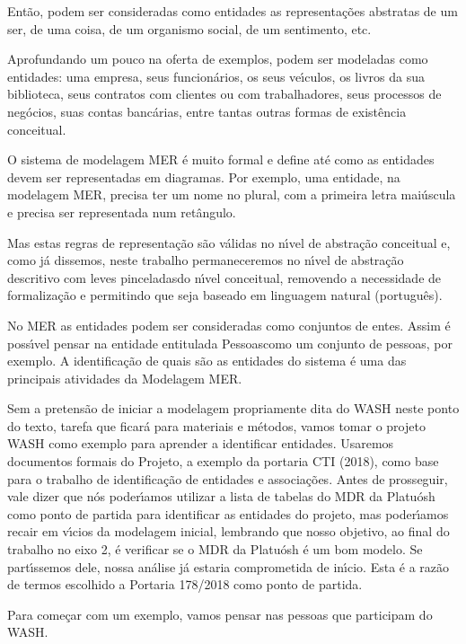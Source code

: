 \documentclass[
12pt,		%
openright,	%
twoside,  %
a4paper,			%
chapter=TITLE,		%
english,			%
french,				%
spanish,			%
brazil				%
]{USPSC-classe/USPSC}
\begin{document}
Ent\~ao, podem ser consideradas como entidades as representa\c{c}\~oes abstratas de um ser, de uma coisa, de um organismo social, de um sentimento, etc.


Aprofundando um pouco na oferta de exemplos, podem ser modeladas como entidades: uma empresa, seus funcion\'arios, os seus ve\'{\i}culos, os livros da sua biblioteca, seus contratos com clientes ou com trabalhadores, seus processos de neg\'ocios, suas contas banc\'arias, entre tantas outras formas de exist\^encia conceitual.


O sistema de modelagem MER \'e muito formal e define at\'e como as entidades devem ser representadas em diagramas. Por exemplo, uma entidade, na modelagem MER, precisa ter um nome no plural, com a primeira letra mai\'uscula e precisa ser representada num ret\^angulo.


Mas estas regras de representa\c{c}\~ao s\~ao v\'alidas no n\'{\i}vel de abstra\c{c}\~ao conceitual e, como j\'a dissemos, neste trabalho permaneceremos no n\'{\i}vel de abstra\c{c}\~ao descritivo com \textquotedbl leves pinceladas\textquotedbl  do n\'{\i}vel conceitual, removendo a necessidade de formaliza\c{c}\~ao e permitindo que seja baseado em linguagem natural (portugu\^es).


No MER as entidades podem ser consideradas como conjuntos de entes. Assim \'e poss\'{\i}vel pensar na entidade entitulada \textquotedbl Pessoas\textquotedbl  como um conjunto de pessoas, por exemplo. A identifica\c{c}\~ao de quais s\~ao as entidades do sistema \'e uma das principais atividades da Modelagem MER.


Sem a pretens\~ao de iniciar a modelagem propriamente dita do WASH neste ponto do texto, tarefa que ficar\'a para materiais e m\'etodos, vamos tomar o projeto WASH como exemplo para aprender a identificar entidades. Usaremos documentos formais do Projeto, a exemplo da portaria CTI (2018), como base para o trabalho de identifica\c{c}\~ao de entidades e associa\c{c}\~oes. Antes de prosseguir, vale dizer que n\'os poder\'{\i}amos utilizar a lista de tabelas do MDR da Platu\'osh como ponto de partida para identificar as entidades do projeto, mas poder\'{\i}amos recair em v\'{\i}cios da modelagem inicial, lembrando que nosso objetivo, ao final do trabalho no eixo 2, \'e verificar se o MDR da Platu\'osh \'e um bom modelo. Se part\'{\i}ssemos dele, nossa an\'alise j\'a estaria comprometida de in\'{\i}cio. Esta \'e a raz\~ao de termos escolhido a Portaria 178/2018 como ponto de partida.


Para come\c{c}ar com um exemplo, vamos pensar nas \textquotedbl pessoas que participam do WASH\textquotedbl .
\end{document}
